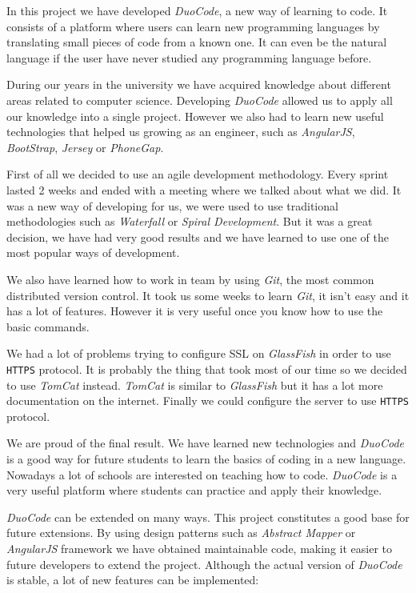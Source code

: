 
In this project we have developed \textit{DuoCode}, a new way of learning to code. It consists of a platform where users can learn new programming languages by translating small pieces of code from a known one. It can even be the natural language if the user have never studied any programming language before.

During our years in the university we have acquired knowledge about different areas related to computer science. Developing \textit{DuoCode} allowed us to apply all our knowledge into a single project. However we also had to learn new useful technologies that helped us growing as an engineer, such as \textit{AngularJS}, \textit{BootStrap}, \textit{Jersey} or \textit{PhoneGap}.

First of all we decided to use an agile development methodology. Every sprint lasted 2 weeks and ended with a meeting where we talked about what we did. It was a new way of developing for us, we were used to use traditional methodologies such as \textit{Waterfall} or \textit{Spiral Development}. But it was a great decision, we have had very good results and we have learned to use one of the most popular ways of development.

We also have learned how to work in team by using \textit{Git}, the most common distributed version control. It took us some weeks to learn \textit{Git}, it isn't easy and it has a lot of features. However it is very useful once you know how to use the basic commands.

We had a lot of problems trying to configure SSL on \textit{GlassFish} in order to use \texttt{HTTPS} protocol. It is probably the thing that took most of our time so we decided to use \textit{TomCat} instead. \textit{TomCat} is similar to \textit{GlassFish} but it has a lot more documentation on the internet. Finally we could configure the server to use \texttt{HTTPS} protocol.

We are proud of the final result. We have learned new technologies and \textit{DuoCode} is a good way for future students to learn the basics of coding in a new language. Nowadays a lot of schools are interested on teaching how to code. \textit{DuoCode} is a very useful platform where students can practice and apply their knowledge.

\textit{DuoCode} can be extended on many ways. This project constitutes a good base for future extensions. By using design patterns such as \textit{Abstract Mapper} or \textit{AngularJS} framework we have obtained maintainable code, making it easier to future developers to extend the project. Although the actual version of \textit{DuoCode} is stable, a lot of new features can be implemented:

